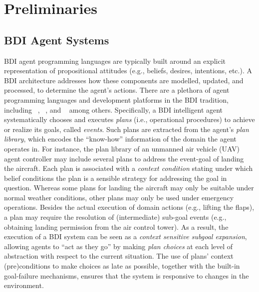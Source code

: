\section{Preliminaries}\label{sec:preliminaries}

\subsection{BDI Agent Systems}


BDI agent programming languages are typically built around an explicit representation of propositional attitudes (e.g., beliefs, desires, intentions, etc.). A BDI architecture addresses how these components are modelled, updated, and processed, to determine the agent's actions.
There are a plethora of agent programming languages and development platforms in the BDI tradition, including
\JACK~\cite{BusettaRHL:AL99-JACK}, 
\JADEX~\cite{Pokahr:EXP03-JADEX}, and
\JASON~\cite{jasonbook}
among others. 
Specifically, a BDI intelligent agent systematically chooses and executes \emph{plans} (i.e., operational procedures) to achieve or realize its goals, called \emph{events}.
Such plans are extracted from the agent's \emph{plan library}, which encodes the ``know-how'' information of the domain the agent operates in.
For instance, the plan library of an unmanned air vehicle (UAV) agent controller may include several plans to address the event-goal of landing the aircraft. Each plan is associated with a \emph{context condition} stating under which belief conditions the plan is a sensible strategy for addressing the goal in question. Whereas some plans for landing the aircraft may only be suitable under normal weather conditions, other plans may only be used under emergency operations.
Besides the actual execution of domain actions (e.g., lifting the flaps), a plan may require the resolution of (intermediate) sub-goal events (e.g., obtaining landing permission from the air control tower). As a result, the execution of a BDI system can be seen as a \textit{context sensitive subgoal expansion}, allowing agents to ``act as they go'' by making \emph{plan choices} at each level of abstraction with respect to the current situation. The use of plans' context (pre)conditions to make choices as late as possible, together with the built-in goal-failure mechanisms, ensures that the system is responsive to changes in the environment. 

